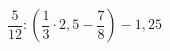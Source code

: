 \begin{ex}[type=calculate]
	\begin{condition}
		\( \dfrac{5}{12}:\left( \dfrac{1}{3}\cdot2,5-\dfrac{7}{8} \right)-1,25 \)
	\end{condition}
\end{ex}